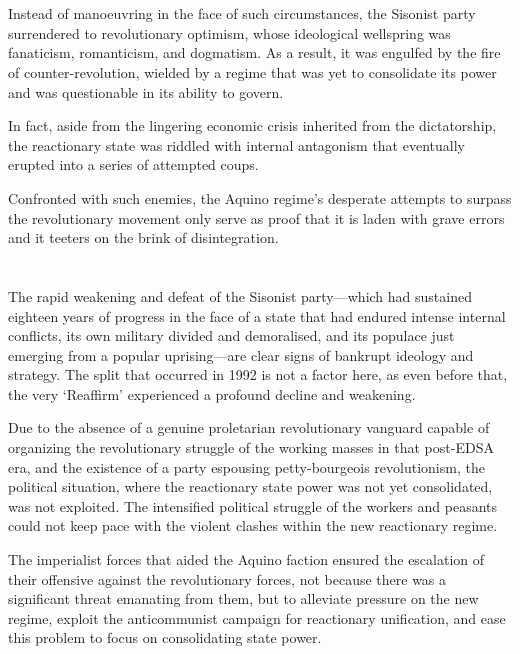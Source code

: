 \section{}
Instead of manoeuvring in the face of such circumstances,
the Sisonist party surrendered to revolutionary optimism, 
whose ideological wellspring was fanaticism, romanticism, and dogmatism. 
As a result, it was engulfed by the fire of counter-revolution, 
wielded by a regime that was yet to consolidate its power
and was questionable in its ability to govern.

In fact, 
aside from the lingering economic crisis inherited from the dictatorship, 
the reactionary state was riddled with internal antagonism 
that eventually erupted into a series of attempted coups.

Confronted with such enemies, 
the Aquino regime's desperate attempts 
to surpass the revolutionary movement only 
serve as proof that it is laden with grave errors 
and it teeters on the brink of disintegration.                    


\section{}
The rapid weakening and defeat of the Sisonist party---which 
had sustained eighteen years of progress
in the face of a state that had endured intense internal conflicts,
its own military divided and demoralised, 
and its populace just emerging from a popular uprising---are 
clear signs of bankrupt ideology and strategy.
The split that occurred in 1992 is not a factor here, 
as even before that, the very `Reaffirm' experienced 
a profound decline and weakening.

Due to the absence of a genuine proletarian revolutionary vanguard 
capable of organizing the revolutionary struggle of the working masses 
in that post-EDSA era, 
and the existence of a party espousing petty-bourgeois revolutionism, 
the political situation, where the reactionary state power was 
not yet consolidated, was not exploited. 
The intensified political struggle of the workers and peasants could not 
keep pace with the violent clashes within the new reactionary regime.

The imperialist forces that aided the Aquino faction ensured 
the escalation of their offensive against the revolutionary forces, 
not because there was a significant threat emanating from them, 
but to alleviate pressure on the new regime, 
exploit the anticommunist campaign for reactionary unification, 
and ease this problem to focus on consolidating state power.

